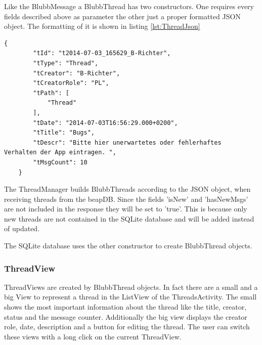 \documentclass[12pt,a4paper,oneside]{report}
\begin{document}
Like the BlubbMessage a BlubbThread has two constructors. One requires every fields described above as parameter the other just a proper formatted JSON object. The formatting of it is shown in listing \ref{lst:ThreadJson}

\begin{lstlisting}[caption=Thread JSON object, label=lst:ThreadJson]
{
        "tId": "t2014-07-03_165629_B-Richter",
        "tType": "Thread",
        "tCreator": "B-Richter",
        "tCreatorRole": "PL",
        "tPath": [
            "Thread"
        ],
        "tDate": "2014-07-03T16:56:29.000+0200",
        "tTitle": "Bugs",
        "tDescr": "Bitte hier unerwartetes oder fehlerhaftes 		Verhalten der App eintragen. ",
        "tMsgCount": 10
    }
\end{lstlisting}

The ThreadManager builds BlubbThreads according to the JSON object, when receiving threads from the beapDB. Since the fields 'isNew' and 'hasNewMsgs' are not included in the response they will be set to 'true'. This is because only new threads are not contained in the SQLite database and will be added instead of updated. 

The SQLite database uses the other constructor to create BlubbThread objects.

\subsubsection{ThreadView}
ThreadViews are created by BlubbThread objects. In fact there are a small and a big View to represent a thread in the ListView of the ThreadsActivity. 
The small shows the most important information about the thread like the title, creator, status and the message counter. Additionally the big view displays the creator role, date, description and a button for editing the thread. The user can switch these views with a long click on the current ThreadView. 
\end{document}
